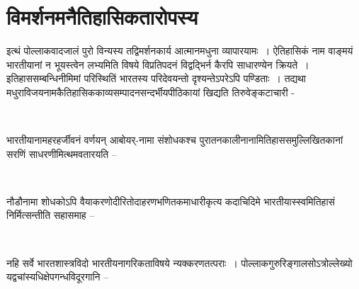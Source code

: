 \section*{विमर्शनमनैतिहासिकतारोपस्य}

इत्थं पोल्लाकवादजालं पुरो विन्यस्य तद्विमर्शनकार्य आत्मानमधुना व्यापारयामः~। ऐतिहासिकं नाम वाङ्मयं भारतीयानां न भूयस्त्वेन लभ्यमिति विषये विप्रतिपदनं विद्वद्भिर्न कैरपि साधारण्येन क्रियते~। इतिहाससम्बन्धिनीमिमां परिस्थितिं भारतस्य परिदेवयन्तो दृश्यन्तेऽपरेऽपि पण्डिताः~। तद्यथा मधुराविजयनामकैतिहासिककाव्यसम्पादनसन्दर्भीयपीठिकायां खिद्यति तिरुवेङ्कटाचारी -

\begin{myquote}

~\hfill {}
\end{myquote}

भारतीयानामहरहर्जीवनं वर्णयन् आबोयर्-नामा संशोधकश्च पुरातनकालीनानामितिहाससमुल्लिखितकानां सरणिं साधरणीमित्थमवतारयति –

\begin{myquote}

~\hfill {}
\end{myquote}

नौडौनामा शोधकोऽपि वैयाकरणोदीरितोदाहरणभणितकमाधारीकृत्य कदाचिदिमे भारतीयास्स्वमितिहासं निर्मित्सन्तीति सहासमाह –

\newpage

\begin{myquote}

~\hfill {}
\end{myquote}

नहि सर्वे भारतशास्त्रविदो  भारतीयनागरिकताविषये न्यक्करणतत्पराः~। पोल्लाकगुरुरिङ्गालसोऽत्रोल्लेख्यो यद्वचांस्यधिक्षेपगन्धविदूरगानि –

